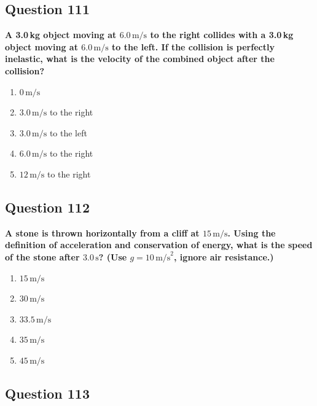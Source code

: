 \documentclass[12pt,letterpaper]{article}
\begin{document}
\subsection{Question 111}

\begin{questionbox}
\textbf{A 3.0\,kg object moving at $6.0\,\text{m/s}$ to the right collides with a 3.0\,kg object moving at $6.0\,\text{m/s}$ to the left. If the collision is perfectly inelastic, what is the velocity of the combined object after the collision?}

\begin{enumerate}[label=\alph*)]
    \item $0\,\text{m/s}$
    \item $3.0\,\text{m/s}$ to the right
    \item $3.0\,\text{m/s}$ to the left
    \item $6.0\,\text{m/s}$ to the right
    \item $12\,\text{m/s}$ to the right
\end{enumerate}
\end{questionbox}

\subsection{Question 112}

\begin{questionbox}
\textbf{A stone is thrown horizontally from a cliff at $15\,\text{m/s}$. Using the definition of acceleration and conservation of energy, what is the speed of the stone after $3.0\,\text{s}$? (Use $g = 10\,\text{m/s}^2$, ignore air resistance.)}

\begin{enumerate}[label=\alph*)]
    \item $15\,\text{m/s}$
    \item $30\,\text{m/s}$
    \item $33.5\,\text{m/s}$
    \item $35\,\text{m/s}$
    \item $45\,\text{m/s}$
\end{enumerate}
\end{questionbox}

\subsection{Question 113}
\end{document}

